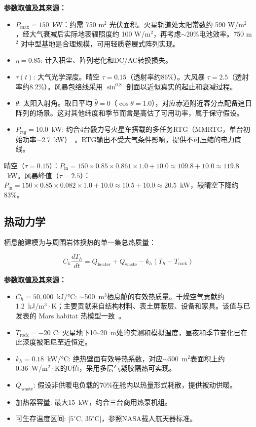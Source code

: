 \documentclass[11pt,a4paper]{ctexart}
\begin{document}
\textbf{参数取值及其来源：}
\begin{itemize}
  \item $P_{\text{max}} = 150$~kW：约需 750 m$^2$ 光伏面积。火星轨道处太阳常数约 590 W/m$^2$，经大气衰减后实际地表辐照度约 100 W/m$^2$，再考虑$\sim$20\%电池效率。750 m$^2$ 对中型基地是合理规模，可用轻质卷展式阵列实现。
  \item $\eta = 0.85$: 计入积尘、阵列老化和DC/AC转换损失。
  \item $\tau(t)$: 大气光学深度。晴空 $\tau = 0.15$（透射率约86\%）。大风暴 $\tau = 2.5$（透射率约8.2\%）。风暴包络线采用 $\sin^{0.8}$ 剖面以近似真实的起止和衰减过程。
  \item $\theta$: 太阳入射角。取日平均 $\bar{\theta} = 0$（$\cos\theta = 1.0$），对应赤道附近春分点配备追日阵列的场景。这对其他纬度和季节而言是高估了可用功率，属于保守假设。
  \item $P_{\text{rtg}} = 10.0$~kW: 约合4台毅力号火星车搭载的多任务RTG（MMRTG，单台初始功率$\sim$2.7~kW）~\cite{kilopower}。RTG输出不受大气条件影响，提供不可压缩的电力底线。
\end{itemize}

晴空（$\tau = 0.15$）：$P_{\text{in}} = 150 \times 0.85 \times 0.861 \times 1.0 + 10.0 \approx 109.8 + 10.0 \approx 119.8$~kW。风暴峰值（$\tau = 2.5$）：$P_{\text{in}} = 150 \times 0.85 \times 0.082 \times 1.0 + 10.0 \approx 10.5 + 10.0 \approx 20.5$~kW，较晴空下降约83\%。

\subsection{热动力学}

栖息舱建模为与周围岩体换热的单一集总热质量：

\begin{equation}\label{eq:thermal}
  C_h \frac{dT_h}{dt} = Q_{\text{heater}} + Q_{\text{waste}} - k_h (T_h - T_{\text{rock}})
\end{equation}

\textbf{参数取值及其来源：}
\begin{itemize}
  \item $C_h = 50,\!000$~kJ/°C: $\sim$500~m$^3$栖息舱的有效热质量。干燥空气贡献约1.2~kJ/m$^3\!\cdot\!$K；主要贡献来自结构材料、表土屏蔽层、设备和家具。该值与已发表的 Mars habitat 热模型一致~\cite{mars_thermal}。
  \item $T_{\text{rock}} = -20^\circ$C: 火星地下10--20~m处的实测和模拟温度，昼夜和季节变化已在此深度被阻尼至近恒定。
  \item $k_h = 0.18$~kW/°C: 绝热壁面有效导热系数，对应$\sim$500~m$^2$表面积上约0.36~W/m$^2\!\cdot\!$K的U值，采用多层气凝胶隔热可实现。
  \item $Q_{\text{waste}}$: 假设非供暖电负载的70\%在舱内以热量形式耗散，提供被动供暖。
  \item 加热器容量: 最大15~kW，约合三台商用热泵机组。
  \item 可生存温度区间: [$5^\circ$C, $35^\circ$C]，参照NASA载人航天器标准。
\end{itemize}
\end{document}
